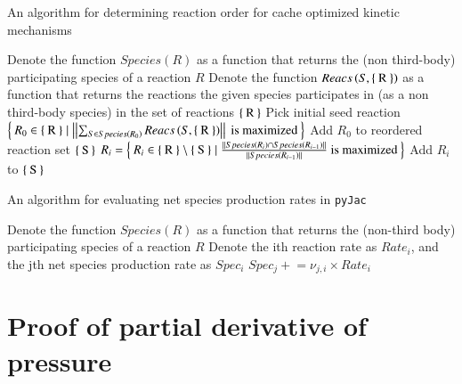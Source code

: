 \documentclass[preprint,12pt]{elsarticle}
\newcommand{\pluseq}{\mathrel{+}=}
\begin{document}
{\begin{algorithm}
\caption{An algorithm for determining reaction order for cache optimized kinetic mechanisms}\label{p:cache_opt_rxn}
\begin{algorithmic}[0]
  \State Denote the function $Species\left(R\right)$ as a function that returns the (non third-body) participating species of a reaction $R$
  \State Denote the function $Reacs\left(S, \Set{\text{R}}\right)$ as a function that returns the reactions the given species participates in (as a non third-body species) in the set of reactions $\Set{\text{R}}$
  \State Pick initial seed reaction $\Set{R_0 \in \Set{\text{R}} \mid \left|\left|\sum_{S\in Species\left(R_0\right)}Reacs\left(S, \Set{\text{R}}\right)\right|\right|\text{ is maximized}}$
  \State Add $R_0$ to reordered reaction set $\Set{\text{S}}$
  		\State $R_i = \Set{R_i \in \Set{\text{R}} \setminus \Set{\text{S}} \mid \frac{\left|\left|Species\left(R_i\right) \cap Species\left(R_{i - 1}\right)\right|\right|}{\left|\left|Species\left(R_{i - 1}\right)\right|\right|}\text{ is maximized}}$
  		\State Add $R_i$ to $\Set{\text{S}}$
  \EndWhile
\end{algorithmic}
\end{algorithm}

\begin{algorithm}
\caption{An algorithm for evaluating net species production rates in \texttt{pyJac}}\label{p:spec_rates_sub}
\begin{algorithmic}[0]
  \State Denote the function $Species\left(R\right)$ as a function that returns the (non-third body) participating species of a reaction $R$
  \State Denote the ith reaction rate as $Rate_i$, and the jth net species production rate as $Spec_i$
  			\State $Spec_j \pluseq \nu_{j, i} \times Rate_i$
  		\EndFor
  \EndFor
\end{algorithmic}
\end{algorithm}

\pagebreak


\appendix


\section{Proof of partial derivative of pressure}
\label{A:pres_deriv}

}
\end{document}
